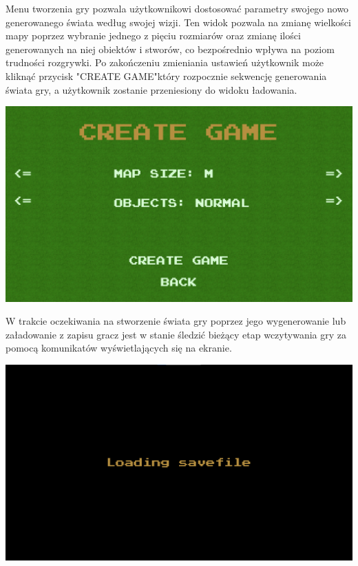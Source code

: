 \documentclass{article}
\begin{document}
Menu tworzenia gry pozwala użytkownikowi dostosować parametry swojego nowo generowanego świata według swojej wizji. Ten widok pozwala na zmianę wielkości mapy poprzez wybranie jednego z pięciu rozmiarów oraz zmianę ilości generowanych na niej obiektów i stworów, co bezpośrednio wpływa na poziom trudności rozgrywki. Po zakończeniu zmieniania ustawień użytkownik może kliknąć przycisk "CREATE GAME"\space który rozpocznie sekwencję generowania świata gry, a użytkownik zostanie przeniesiony do widoku ładowania.
\begin{center}
     \includegraphics[width=\textwidth]{createGameMenu.png}
\end{center}
W trakcie oczekiwania na stworzenie świata gry poprzez jego wygenerowanie lub załadowanie z zapisu gracz jest w stanie śledzić bieżący etap wczytywania gry za pomocą komunikatów wyświetlających się na ekranie.
\begin{center}
     \includegraphics[width=\textwidth]{loadingView.png}
\end{center}
\newpage
\end{document}
